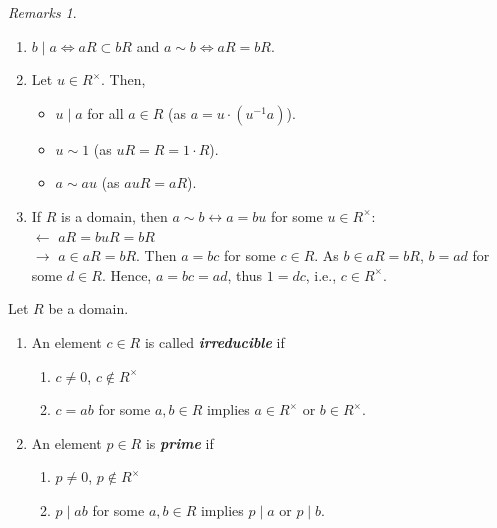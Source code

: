 \documentclass[twoside]{article}
\theoremstyle{remark}
\newtheorem*{remarks}{{Remarks}}
\newcounter{theorem}
\newcommand*\term[1]{\textbf{\textit{\mathversion{bold}#1}}}
\begin{document}
\begin{remarks}\phantom{}
  \begin{enumerate}[label=\arabic*.]
    \item \(b \mid a \iff aR \subset bR\) and \(a \sim b \iff aR = bR\).
    \item Let \(u \in R^\times\). Then, 
    \begin{itemize}[label=\textbullet, nosep]
      \item \(u \mid a\) for all \(a \in R\) (as \(a = u \cdot (u^{-1}a)\)).
      \item \(u \sim 1\) (as \(uR = R = 1 \cdot R\)).
      \item \(a \sim au\) (as \(auR = aR\)).
    \end{itemize}
    \item If \(R\) is a domain, then \(a \sim b \leftrightarrow a = bu\) for some \(u \in R^\times\): \\
    \(\leftarrow\) \(aR = buR = bR\) \\
    \(\rightarrow\) \(a \in aR = bR\). Then \(a = bc\) for some \(c \in R\). As \(b \in aR = bR\), \(b = ad\) for some \(d \in R\). Hence, \(a = bc = ad\), thus \(1 = dc\), i.e., \(c \in R^\times\).
  \end{enumerate}
\end{remarks}

\begin{definition} 
  Let \(R\) be a domain.
  \begin{enumerate}[label=\arabic*.]
    \item An element \(c \in R\) is called \term{irreducible} if
    \begin{enumerate}[label=(\arabic*), nosep]
      \item \(c \neq 0\), \(c \notin R^\times\)
      \item \(c = ab\) for some \(a,b \in R\) implies \(a \in R^\times\) or \(b \in R^\times\).
    \end{enumerate}
    \item An element \(p \in R\) is \term{prime} if
    \begin{enumerate}[label=(\arabic*), nosep]
      \item \(p \neq 0\), \(p \notin R^\times\)
      \item \(p \mid ab\) for some \(a,b \in R\) implies \(p \mid a\) or \(p \mid b\).
    \end{enumerate}
  \end{enumerate}
\end{definition}
\end{document}
